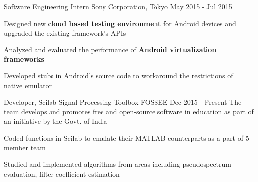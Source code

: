 \begin{cventries}
%
%
\cventry
{Software Engineering Intern} %
{Sony Corporation, Tokyo} %
{May 2015 - Jul 2015} %
{ %
    \begin{cvitems}
        \item {Designed new \textbf{cloud based testing environment} for Android devices and upgraded the existing framework's APIs}
        \item {Analyzed and evaluated the performance of \textbf{Android virtualization frameworks}} 
        \item {Developed stubs in Android's source code to workaround the restrictions of native emulator}
    \end{cvitems}
}
\cventrylong
{Developer, Scilab Signal Processing Toolbox} %
{FOSSEE} %
{Dec 2015 - Present} %
{The team develops and promotes free and open-source software in education as part of an initiative by the Govt. of India}
{ %
    \begin{cvitems}
        \item {Coded functions in Scilab to emulate their MATLAB counterparts as a part of 5-member team}
        \item {Studied and implemented algorithms from areas including pseudospectrum evaluation, filter coefficient estimation}
    \end{cvitems}
}
\end{cventries}